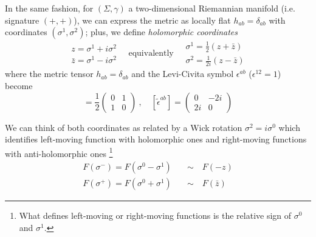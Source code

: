 \documentclass[a4paper,12pt]{article}
\numberwithin{equation}{section}
\numberwithin{thm}{section}
\numberwithin{exm}{section}
\newcommand{\wt}{\widetilde}
\newcommand{\<}{{\langle}}
\renewcommand{\>}{{\rangle}}
\renewcommand{\d}{{\delta}}
\newcommand{\e}{{\epsilon}}
\newcommand{\s}{{\sigma}}
\begin{document}
In the same fashion, for $(\Sigma,\gamma)$ a two-dimensional Riemannian manifold (i.e. signature $(+,+)$), we can express the metric as locally flat $h_{ab} = \d_{ab}$ with coordinates $(\s^1, \s^2)$; plus, we define {\it holomorphic coordinates}%
	\begin{equation}
	\begin{array}{l}
		z      = \s^1 + i\s^2 \\
		\bar z = \s^1 - i\s^2
	\end{array}
	\quad\text{equivalently}\quad	
	\begin{array}{l}
	 	\s^1 = \frac{1}{2}(z + \bar z) \\
	 	\s^2 = \frac{1}{2i}(z - \bar z)
	\end{array} 
	\end{equation}
where the metric tensor $h_{ab} = \d_{ab}$ and the Levi-Civita symbol $\e^{ab}$ ($\e^{12} = 1$) become
	\begin{equation}
	[\wt\d_{ab}] = \frac{1}{2} \left(
		\begin{array}{cc}
		0 & 1 \\
		1 & 0
		\end{array}
	\right)\ ,\quad [\wt\e^{ab}] = \left(
		\begin{array}{cc}
		0 & -2i \\
		2i & 0
		\end{array}
	\right)
	\end{equation}

We can think of both coordinates as related by a Wick rotation $\s^2=i\s^0$ which identifies left-moving function with holomorphic ones and right-moving functions with anti-holomorphic ones%
\footnote{What defines left-moving or right-moving functions is the relative sign of $\s^0$ and $\s^1$.}
	\begin{align}
	F(\s^-) = F(\s^0 - \s^1)\quad & \sim\quad F(-z) \\
	F(\s^+) = F(\s^0 + \s^1)\quad & \sim\quad F(\bar z)
	\end{align}
\end{document}
